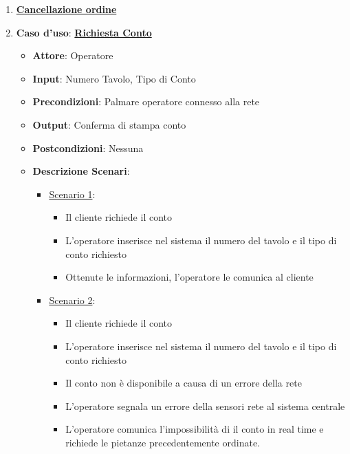 \begin{enumerate}
    \item \uline {{\bf Cancellazione ordine}}
    \item {\bf Caso d'uso}: \uline{{\bf Richiesta Conto}}
    \begin{itemize}
        \item {\bf Attore}: Operatore
        \item {\bf Input}: Numero Tavolo, Tipo di Conto
        \item {\bf Precondizioni}: Palmare operatore connesso alla rete
        \item {\bf Output}: Conferma di stampa conto
        \item {\bf Postcondizioni}: Nessuna
        \item {\bf Descrizione Scenari}:
        \begin{itemize}
            \item \uline{Scenario 1}:
            \begin{itemize}
                \item Il cliente richiede il conto
                \item L'operatore inserisce nel sistema il numero del tavolo e il 
                    tipo di conto richiesto
                \item Ottenute le informazioni, l'operatore le comunica al cliente
            \end{itemize}
            \item \uline{Scenario 2}:
            \begin{itemize}
                \item Il cliente richiede il conto
                \item L'operatore inserisce nel sistema il numero del tavolo e il 
                    tipo di conto richiesto
                \item Il conto non \`e disponibile a causa di un errore della rete
                \item L'operatore segnala un errore della sensori rete al sistema centrale
                \item L'operatore comunica l'impossibilit\`a di il conto in real time e richiede
                    le pietanze precedentemente ordinate.
            \end{itemize}
        \end{itemize}
    \end{itemize}


\end{enumerate}
